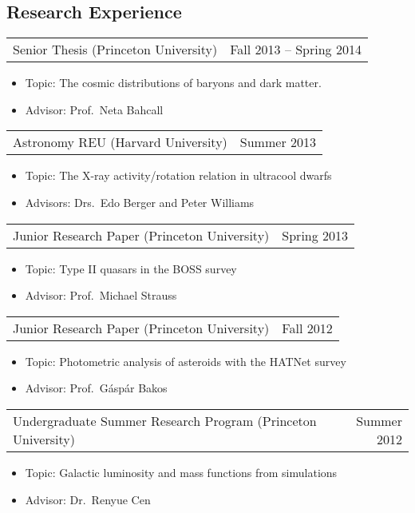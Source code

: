 \documentclass{res}
\begin{document}
\begin{resume}
\section{\textbf{Research Experience}}
\vspace{0.1in}
\begin{tabular}{@{}p{4in} r}
  Senior Thesis (Princeton University) & Fall 2013 -- Spring 2014
\end{tabular}
\begin{itemize} \itemsep -2pt
\item[] Topic: The cosmic distributions of baryons and dark matter.
\item[] Advisor: Prof.~Neta Bahcall
\end{itemize}
\begin{tabular}{@{}p{4in} r}
  Astronomy REU (Harvard University) & Summer 2013
\end{tabular}
\begin{itemize} \itemsep -2pt
\item[] Topic: The X-ray activity/rotation relation in ultracool
  dwarfs
\item[] Advisors: Drs.~Edo Berger and Peter Williams
\end{itemize}
\begin{tabular}{@{}p{4in} r}
  Junior Research Paper (Princeton University) & Spring 2013
\end{tabular}
\begin{itemize} \itemsep -2pt
\item[] Topic: Type II quasars in the BOSS survey
\item[] Advisor: Prof.~Michael Strauss
\end{itemize}
\begin{tabular}{@{}p{4in} r}
  Junior Research Paper (Princeton University) & Fall 2012
\end{tabular}
\begin{itemize} \itemsep -2pt
\item[] Topic: Photometric analysis of asteroids with the HATNet
  survey
\item[] Advisor: Prof.~G\'asp\'ar Bakos
\end{itemize}
\begin{tabular}{@{}p{4in} r}
  Undergraduate Summer Research Program (Princeton University) &
  Summer 2012
\end{tabular}
\begin{itemize} \itemsep -2pt
\item[] Topic: Galactic luminosity and mass functions from simulations
\item[] Advisor: Dr.~Renyue Cen
\end{itemize}


\end{resume}
\end{document}
